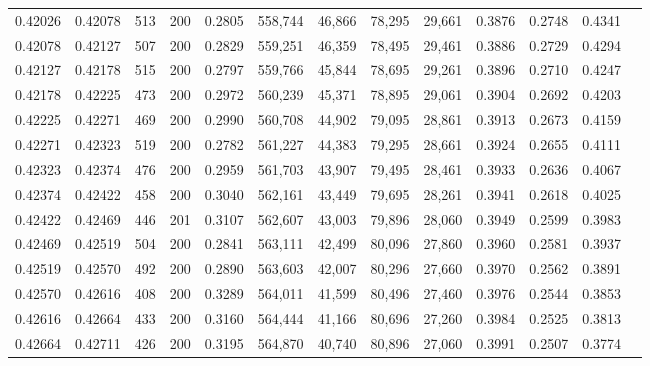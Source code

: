 \begin{tabular}{rrrrrrrrrrrrr}
0.42026 & 0.42078 &   513 & 200 &                                     0.2805 & 558,744 &  46,866 &  78,295 &  29,661 & 0.3876 & 0.2748 & 0.4341 \\
0.42078 & 0.42127 &   507 & 200 &                                     0.2829 & 559,251 &  46,359 &  78,495 &  29,461 & 0.3886 & 0.2729 & 0.4294 \\
0.42127 & 0.42178 &   515 & 200 &                                     0.2797 & 559,766 &  45,844 &  78,695 &  29,261 & 0.3896 & 0.2710 & 0.4247 \\
0.42178 & 0.42225 &   473 & 200 &                                     0.2972 & 560,239 &  45,371 &  78,895 &  29,061 & 0.3904 & 0.2692 & 0.4203 \\
0.42225 & 0.42271 &   469 & 200 &                                     0.2990 & 560,708 &  44,902 &  79,095 &  28,861 & 0.3913 & 0.2673 & 0.4159 \\
0.42271 & 0.42323 &   519 & 200 &                                     0.2782 & 561,227 &  44,383 &  79,295 &  28,661 & 0.3924 & 0.2655 & 0.4111 \\
0.42323 & 0.42374 &   476 & 200 &                                     0.2959 & 561,703 &  43,907 &  79,495 &  28,461 & 0.3933 & 0.2636 & 0.4067 \\
0.42374 & 0.42422 &   458 & 200 &                                     0.3040 & 562,161 &  43,449 &  79,695 &  28,261 & 0.3941 & 0.2618 & 0.4025 \\
0.42422 & 0.42469 &   446 & 201 &                                     0.3107 & 562,607 &  43,003 &  79,896 &  28,060 & 0.3949 & 0.2599 & 0.3983 \\
0.42469 & 0.42519 &   504 & 200 &                                     0.2841 & 563,111 &  42,499 &  80,096 &  27,860 & 0.3960 & 0.2581 & 0.3937 \\
0.42519 & 0.42570 &   492 & 200 &                                     0.2890 & 563,603 &  42,007 &  80,296 &  27,660 & 0.3970 & 0.2562 & 0.3891 \\
0.42570 & 0.42616 &   408 & 200 &                                     0.3289 & 564,011 &  41,599 &  80,496 &  27,460 & 0.3976 & 0.2544 & 0.3853 \\
0.42616 & 0.42664 &   433 & 200 &                                     0.3160 & 564,444 &  41,166 &  80,696 &  27,260 & 0.3984 & 0.2525 & 0.3813 \\
0.42664 & 0.42711 &   426 & 200 &                                     0.3195 & 564,870 &  40,740 &  80,896 &  27,060 & 0.3991 & 0.2507 & 0.3774 \\

\end{tabular}
